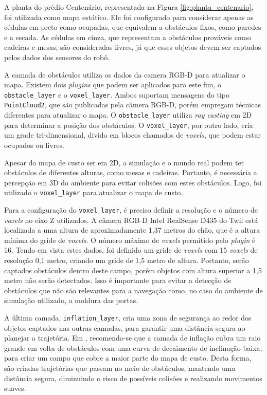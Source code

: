 \documentclass[repeatfields,xlists,xpacks,oneside,yearsonly]{ufrgscca}
\begin{document}
A planta do prédio Centenário, representada na Figura
\ref{fig:planta_centenario}, foi utilizada como mapa estático. Ele
foi configurado para considerar apenas as cédulas em preto como
ocupadas, que equivalem a obstáculos fixos, como paredes e a escada.
As cédulas em cinza, que representam a obstáculos prováveis como
cadeiras e mesas, são consideradas livres, já que esses objetos devem
ser captados pelos dados dos sensores do robô.

A camada de obstáculos utiliza os dados da camera RGB-D para
atualizar o mapa. Existem dois \textit{plugins} que podem ser
aplicados para este fim, o \texttt{obstacle\_layer} e o
\texttt{voxel\_layer}. Ambos suportam mensagens do tipo
\texttt{PointCloud2}, que são publicadas pela câmera RGB-D, porém
empregam técnicas diferentes para atualizar o mapa.  O \texttt{obstacle\_layer} utiliza
\textit{ray casting} em 2D para determinar a posição dos obstáculos.
O \texttt{voxel\_layer}, por outro lado, cria um grade
tri-dimensional, divido em blocos chamados de \textit{voxels}, que
podem estar ocupados ou livres.

Apesar do mapa de custo ser em 2D, a simulação e o mundo real podem
ter obstáculos de diferentes alturas, como mesas e cadeiras.
Portanto, é necessária a percepção em 3D do ambiente para evitar
colisões com estes obstáculos. Logo, foi utilizado o
\texttt{voxel\_layer} para atualizar o mapa de custo.

Para a configuração do \texttt{voxel\_layer}, é preciso definir a
resolução e o número de \textit{voxels} no eixo Z utilizados. A
câmera RGB-D Intel RealSense D435 do Twil está localizada a uma
altura de aproximadamente 1,37 metros do chão, que é a altura mínima
do gride de \textit{voxels}. O número máximo de \textit{voxels}
permitido pelo \textit{plugin} é 16. Tendo em vista estes dados, foi
definido um gride de \textit{voxels} com 15 \textit{voxels} de
resolução 0,1 metro, criando um gride de 1,5 metro de altura.
Portanto, serão captados obstáculos dentro deste campo, porém objetos
com altura superior a 1,5 metro não serão detectados. Isso é
importante para evitar a detecção de obstáculos que não são
relevantes para a navegação como, no caso do ambiente de simulação
utilizado, a moldura das portas.

A última camada, \texttt{inflation\_layer}, cria uma zona de
segurança ao redor dos objetos captados nas outras camadas, para
garantir uma distância segura ao planejar a trajetória. Em
\textcite{ros_tuning_guide}, recomenda-se que a camada de inflação
cubra um raio grande em volta de obstáculos com uma curva de
decaimento de inclinação baixa, para criar um campo que cobre a maior
parte do mapa de custo. Desta forma, são criadas trajetórias que
passam no meio de obstáculos, mantendo uma distância segura,
diminuindo o risco de possíveis colisões e realizando movimentos
suaves.
\end{document}
